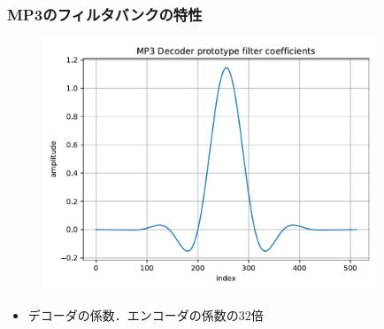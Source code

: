 \documentclass[14pt,xcolor=dvipsnames,table,dvipdfmx]{beamer}
\begin{document}
\begin{frame}[c]
    \frametitle{MP3のフィルタバンクの特性}
    \vspace{-5pt}
    \begin{figure}
        \includegraphics[width=100mm]{./figs/mp3_decoder_prototype_filter_coef.pdf}
    \end{figure}
    \vspace{-5pt}
    \begin{itemize}
        \item デコーダの係数．エンコーダの係数の$32$倍
    \end{itemize}
\end{frame}
\end{document}
